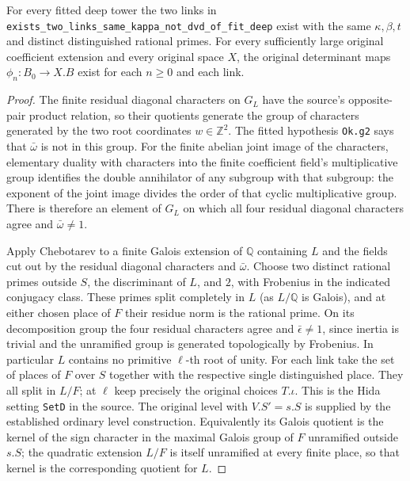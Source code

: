 \begin{theorem}
\label{thm:rh-four-link-maps}
For every fitted deep tower the two links in
\texttt{exists\_two\_links\_same\_kappa\_not\_dvd\_of\_fit\_deep}
exist with the same $\kappa,\beta,t$ and distinct distinguished
rational primes. For every sufficiently large original coefficient
extension and every original space $X$, the original determinant
maps $\phi_n:B_0\to X.B$ exist for each $n\geq0$ and each link.
\end{theorem}
\begin{proof}
The finite residual diagonal characters on $G_L$ have the
source's opposite-pair product relation, so their quotients
generate the group of characters generated by the two root
coordinates $w\in\mathbb Z^2$. The fitted hypothesis
\texttt{Ok.g2} says that $\bar\omega$ is not in this group.
For the finite abelian joint image of the characters, elementary
duality with characters into the finite coefficient field's
multiplicative group identifies the double annihilator of any
subgroup with that subgroup: the exponent of the joint image
divides the order of that cyclic multiplicative group.
There is therefore an element of $G_L$ on which all four
residual diagonal characters agree and $\bar\omega\ne1$.

Apply Chebotarev to a finite Galois extension of $\mathbb Q$
containing $L$ and the fields cut out by the residual diagonal
characters and $\bar\omega$. Choose two distinct rational primes
outside $S$, the discriminant of $L$, and $2$, with Frobenius
in the indicated conjugacy class. These primes split completely
in $L$ (as $L/\mathbb Q$ is Galois), and at either chosen place
of $F$ their residue norm is the rational prime. On its
decomposition group the four residual characters agree
and $\bar\epsilon\ne1$, since inertia is trivial and the
unramified group is generated topologically by Frobenius.
In particular $L$ contains no primitive $\ell$-th root of
unity. For each link take the set of places of $F$ over $S$
together with the respective single distinguished place.
They all split in $L/F$; at $\ell$ keep precisely the
original choices $T.\iota$. This is the Hida setting
\texttt{SetD} in the source. The original level with
$V.S'=s.S$ is supplied by the established ordinary
level construction. Equivalently its Galois quotient is the
kernel of the sign character in the maximal Galois group of
$F$ unramified outside $s.S$; the quadratic extension
$L/F$ is itself unramified at every finite place, so that
kernel is the corresponding quotient for $L$.


\end{proof}
